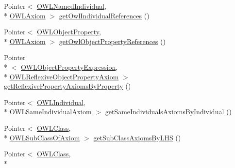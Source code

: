 \begin{DoxyCompactItemize}
Pointer$<$ \hyperlink{interfaceorg_1_1semanticweb_1_1owlapi_1_1model_1_1_o_w_l_named_individual}{O\-W\-L\-Named\-Individual}, \\*
\hyperlink{interfaceorg_1_1semanticweb_1_1owlapi_1_1model_1_1_o_w_l_axiom}{O\-W\-L\-Axiom} $>$ \hyperlink{interfaceuk_1_1ac_1_1manchester_1_1cs_1_1owl_1_1owlapi_1_1_internals_a6b25a6b608d964fb25aae1ac6ddacceb}{get\-Owl\-Individual\-References} ()
\item 
Pointer$<$ \hyperlink{interfaceorg_1_1semanticweb_1_1owlapi_1_1model_1_1_o_w_l_object_property}{O\-W\-L\-Object\-Property}, \\*
\hyperlink{interfaceorg_1_1semanticweb_1_1owlapi_1_1model_1_1_o_w_l_axiom}{O\-W\-L\-Axiom} $>$ \hyperlink{interfaceuk_1_1ac_1_1manchester_1_1cs_1_1owl_1_1owlapi_1_1_internals_a2569b30e1265f32f69d72fc9b1948d56}{get\-Owl\-Object\-Property\-References} ()
\item 
Pointer\\*
$<$ \hyperlink{interfaceorg_1_1semanticweb_1_1owlapi_1_1model_1_1_o_w_l_object_property_expression}{O\-W\-L\-Object\-Property\-Expression}, \\*
\hyperlink{interfaceorg_1_1semanticweb_1_1owlapi_1_1model_1_1_o_w_l_reflexive_object_property_axiom}{O\-W\-L\-Reflexive\-Object\-Property\-Axiom} $>$ \hyperlink{interfaceuk_1_1ac_1_1manchester_1_1cs_1_1owl_1_1owlapi_1_1_internals_a26f68376caf4b0009ae596bfc5f6749a}{get\-Reflexive\-Property\-Axioms\-By\-Property} ()
\item 
Pointer$<$ \hyperlink{interfaceorg_1_1semanticweb_1_1owlapi_1_1model_1_1_o_w_l_individual}{O\-W\-L\-Individual}, \\*
\hyperlink{interfaceorg_1_1semanticweb_1_1owlapi_1_1model_1_1_o_w_l_same_individual_axiom}{O\-W\-L\-Same\-Individual\-Axiom} $>$ \hyperlink{interfaceuk_1_1ac_1_1manchester_1_1cs_1_1owl_1_1owlapi_1_1_internals_a66ee8899e86d49fdbccb83857d74d6f1}{get\-Same\-Individuals\-Axioms\-By\-Individual} ()
\item 
Pointer$<$ \hyperlink{interfaceorg_1_1semanticweb_1_1owlapi_1_1model_1_1_o_w_l_class}{O\-W\-L\-Class}, \\*
\hyperlink{interfaceorg_1_1semanticweb_1_1owlapi_1_1model_1_1_o_w_l_sub_class_of_axiom}{O\-W\-L\-Sub\-Class\-Of\-Axiom} $>$ \hyperlink{interfaceuk_1_1ac_1_1manchester_1_1cs_1_1owl_1_1owlapi_1_1_internals_a37af7acf15599efda4602a6ab88af2a0}{get\-Sub\-Class\-Axioms\-By\-L\-H\-S} ()
\item 
Pointer$<$ \hyperlink{interfaceorg_1_1semanticweb_1_1owlapi_1_1model_1_1_o_w_l_class}{O\-W\-L\-Class}, \\*

\end{DoxyCompactItemize}
